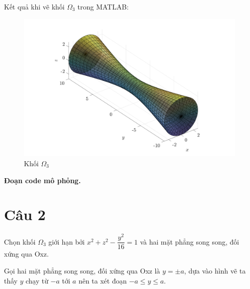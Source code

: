 \documentclass[12pt,a4paper]{article}
\begin{document}
Kết quả khi vẽ khối $\Omega_3$ trong MATLAB:
\begin{figure}[h!]
    \centering
    \includegraphics[scale = 0.525]{figure2.png}
    \caption{Khối $\Omega_3$}
\end{figure}
\newpage
\textbf{Đoạn code mô phỏng.}

\section{Câu 2}
Chọn khối $\Omega_3$ giới hạn bởi $x^2 + z^2 - \dfrac{y^2}{16} = 1$ và hai mặt phẳng song song, đối xứng qua Oxz.

Gọi hai mặt phẳng song song, đối xứng qua Oxz là $y = \pm a$, dựa vào hình vẽ ta thấy $y$ chạy từ $-a$ tới $a$ nên ta xét đoạn $-a \leq y \leq a$.
\end{document}
